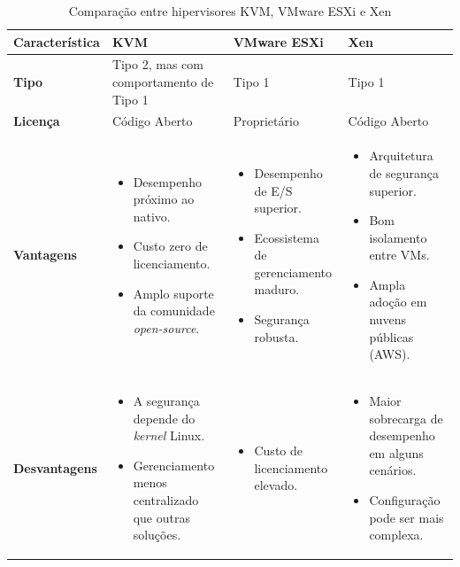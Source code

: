 \begin{table}[H]
    \centering
    \renewcommand{\arraystretch}{1.3}
    \caption{Comparação entre hipervisores KVM, VMware ESXi e Xen}
    \label{tab:hipervisores}
    \begin{tabularx}{\textwidth}{|>{\raggedright\arraybackslash}p{3cm}|X|X|X|}
        \hline
        \textbf{Característica} & \textbf{KVM} & \textbf{VMware ESXi} & \textbf{Xen} \\ \hline
        \textbf{Tipo} & Tipo 2, mas com comportamento de Tipo 1 & Tipo 1 & Tipo 1 \\ \hline
        \textbf{Licença} & Código Aberto & Proprietário & Código Aberto \\ \hline
        \textbf{Vantagens} &
        \begin{itemize}[leftmargin=*]
            \item Desempenho próximo ao nativo.
            \item Custo zero de licenciamento.
            \item Amplo suporte da comunidade \textit{open-source}.
        \end{itemize} &
        \begin{itemize}[leftmargin=*]
            \item Desempenho de E/S superior.
            \item Ecossistema de gerenciamento maduro.
            \item Segurança robusta.
        \end{itemize} &
        \begin{itemize}[leftmargin=*]
            \item Arquitetura de segurança superior.
            \item Bom isolamento entre VMs.
            \item Ampla adoção em nuvens públicas (AWS).
        \end{itemize} \\ \hline
        \textbf{Desvantagens} &
        \begin{itemize}[leftmargin=*]
            \item A segurança depende do \textit{kernel} Linux.
            \item Gerenciamento menos centralizado que outras soluções.
        \end{itemize} &
        \begin{itemize}[leftmargin=*]
            \item Custo de licenciamento elevado.
        \end{itemize} &
        \begin{itemize}[leftmargin=*]
            \item Maior sobrecarga de desempenho em alguns cenários.
            \item Configuração pode ser mais complexa.
        \end{itemize} \\ \hline
    \end{tabularx}
\end{table}

